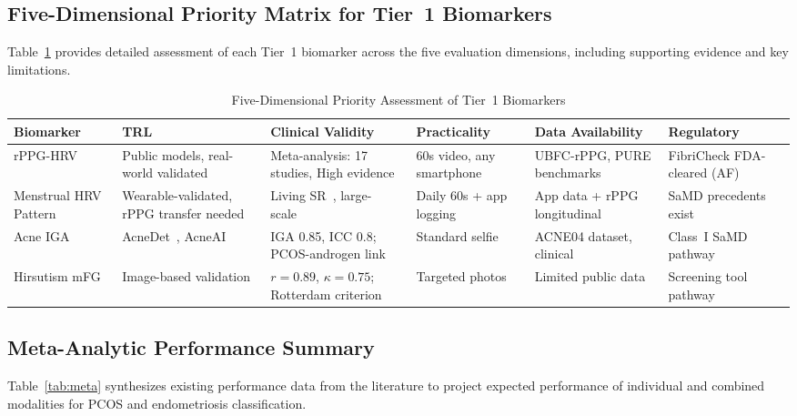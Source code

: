 \documentclass[conference]{IEEEtran}
\begin{document}

\subsection{Five-Dimensional Priority Matrix for Tier~1 Biomarkers}

Table~\ref{tab:priority} provides detailed assessment of each Tier~1 biomarker across the five evaluation dimensions, including supporting evidence and key limitations.

\begin{table}[t]
\centering
\caption{Five-Dimensional Priority Assessment of Tier~1 Biomarkers}
\label{tab:priority}
\begin{tabular}{p{2.8cm}p{2.5cm}p{2.5cm}p{2.5cm}p{2.5cm}p{2.5cm}}
\toprule
\textbf{Biomarker} & \textbf{TRL} & \textbf{Clinical Validity} & \textbf{Practicality} & \textbf{Data Availability} & \textbf{Regulatory} \\
\midrule
rPPG-HRV & Public models, real-world validated~\cite{debnath2025comprehensive} & Meta-analysis: 17 studies, High evidence~\cite{Mirzohreh_2024} & 60s video, any smartphone & UBFC-rPPG, PURE benchmarks & FibriCheck FDA-cleared (AF)~\cite{Sollee_2025} \\
\addlinespace
Menstrual HRV Pattern & Wearable-validated, rPPG transfer needed & Living SR~\cite{de_Jager_2026}, large-scale~\cite{Heydari_2025} & Daily 60s + app logging & App data + rPPG longitudinal & SaMD precedents exist \\
\addlinespace
Acne IGA & AcneDet~\cite{Huynh_2022}, AcneAI~\cite{Gazeau_2024} & IGA 0.85, ICC 0.8; PCOS-androgen link & Standard selfie & ACNE04 dataset, clinical & Class~I SaMD pathway \\
\addlinespace
Hirsutism mFG & Image-based validation~\cite{Oliveira_2022} & $r=0.89$, $\kappa=0.75$; Rotterdam criterion & Targeted photos & Limited public data & Screening tool pathway \\
\bottomrule
\end{tabular}
\end{table}

\subsection{Meta-Analytic Performance Summary}

Table~\ref{tab:meta} synthesizes existing performance data from the literature to project expected performance of individual and combined modalities for PCOS and endometriosis classification.
\end{document}
